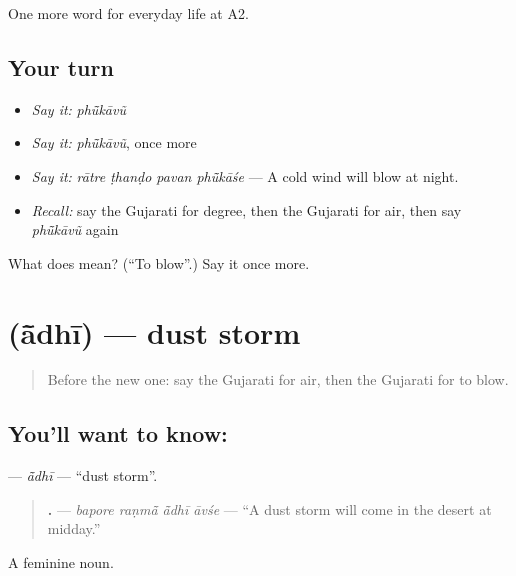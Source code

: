 \begin{grammarlens}[title={What you've built}]
One more word for everyday life at A2.
\end{grammarlens}

\subsection*{Your turn}
\begin{itemize}
\raggedright
  \item \emph{Say it:} \emph{phū̃kāvũ}
  \item \emph{Say it:} \emph{phū̃kāvũ}, once more
  \item \emph{Say it:} \emph{rātre ṭhanḍo pavan phū̃kāśe} — A cold wind will blow at night.
  \item \emph{Recall:} say the Gujarati for degree, then the Gujarati for air, then say \emph{phū̃kāvũ} again
\end{itemize}

\begin{tcolorbox}[breakable,colback=teal!4,colframe=teal!35!black,title={Before you move on}]
What does  mean? (\textquotedblleft{}To blow\textquotedblright{}.) Say it once more.
\end{tcolorbox}
\section[\texorpdfstring{\gu{આંધી} (ā̃dhī)}{આંધી (ā̃dhī)}]{ (ā̃dhī) — dust storm}

\label{lesson:GU-C217-adhi}



\begin{quote}
Before the new one: say the Gujarati for air, then the Gujarati for to blow.
\end{quote}

\subsection*{You'll want to know: }
\textbf{} — \emph{ā̃dhī} — \textquotedblleft{}dust storm\textquotedblright{}.

\begin{quote}
\textbf{   .} — \emph{bapore raṇmā̃ ā̃dhī āvśe} — \textquotedblleft{}A dust storm will come in the desert at midday.\textquotedblright{}
\end{quote}

A feminine noun.

